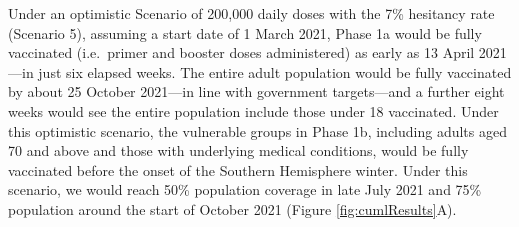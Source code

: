 \documentclass{article}
\begin{document}
Under an optimistic Scenario of 200,000 daily doses with the 7\%
hesitancy rate (Scenario 5), assuming a start date of 1 March 2021,
Phase 1a would be fully vaccinated (i.e.~primer and booster doses
administered) as early as 13 April 2021---in just six elapsed weeks. The
entire adult population would be fully vaccinated by about 25 October
2021---in line with government targets---and a further eight weeks would
see the entire population include those under 18 vaccinated. Under this
optimistic scenario, the vulnerable groups in Phase 1b, including adults
aged 70 and above and those with underlying medical conditions, would be
fully vaccinated before the onset of the Southern Hemisphere winter.
Under this scenario, we would reach 50\% population coverage in late
July 2021 and 75\% population around the start of October 2021 (Figure
\ref{fig:cumlResults}A).
\end{document}
